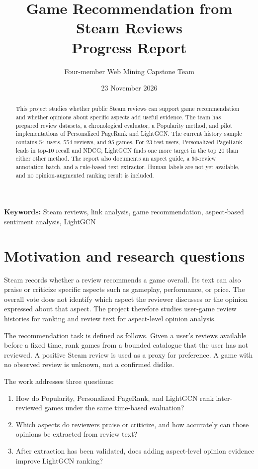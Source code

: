 \documentclass[11pt]{article}
\title{\textbf{Game Recommendation from Steam Reviews}\\
\large Progress Report}
\author{Four-member Web Mining Capstone Team}
\date{23 November 2026}
\begin{document}
\maketitle

\begin{abstract}
This project studies whether public Steam reviews can support game recommendation and whether opinions about specific aspects add useful evidence. The team has prepared review datasets, a chronological evaluator, a Popularity method, and pilot implementations of Personalized PageRank and LightGCN. The current history sample contains 54 users, 554 reviews, and 95 games. For 23 test users, Personalized PageRank leads in top-10 recall and NDCG; LightGCN finds one more target in the top 20 than either other method. The report also documents an aspect guide, a 50-review annotation batch, and a rule-based text extractor. Human labels are not yet available, and no opinion-augmented ranking result is included.
\end{abstract}

\noindent\textbf{Keywords:} Steam reviews, link analysis, game recommendation, aspect-based sentiment analysis, LightGCN

\section{Motivation and research questions}

Steam records whether a review recommends a game overall. Its text can also praise or criticize specific aspects such as gameplay, performance, or price. The overall vote does not identify which aspect the reviewer discusses or the opinion expressed about that aspect. The project therefore studies user-game review histories for ranking and review text for aspect-level opinion analysis.

The recommendation task is defined as follows. Given a user's reviews available before a fixed time, rank games from a bounded catalogue that the user has not reviewed. A positive Steam review is used as a proxy for preference. A game with no observed review is unknown, not a confirmed dislike.

The work addresses three questions:
\begin{enumerate}
  \item How do Popularity, Personalized PageRank, and LightGCN rank later-reviewed games under the same time-based evaluation?
  \item Which aspects do reviewers praise or criticize, and how accurately can those opinions be extracted from review text?
  \item After extraction has been validated, does adding aspect-level opinion evidence improve LightGCN ranking?
\end{enumerate}
\end{document}
